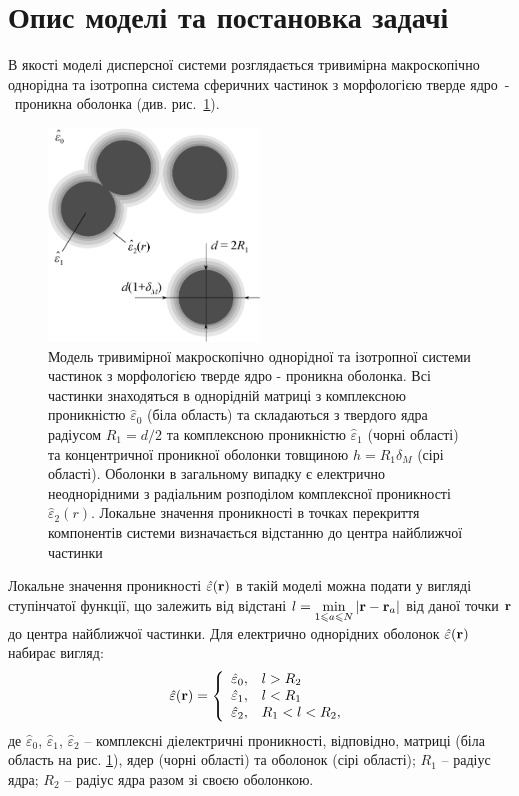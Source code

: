 \documentclass[14pt,twoside]{vakthesis}
\begin{document}
\vspace{40pt}

\section{Опис моделі та постановка задачі}

В якості моделі дисперсної системи розглядається тривимірна макроскопічно однорідна та ізотропна система сферичних частинок з морфологією тверде ядро~-~проникна оболонка (див. рис.~\ref{fig:model-Mlayers}). 
\begin{figure}[!b]
	\vspace{20pt}
	\centering
	\includegraphics[width=0.5\textwidth]{Fig1_Microstructure_new5.eps}
	\caption{\label{fig:model-Mlayers}
		Модель тривимірної макроскопічно однорідної та ізотропної системи частинок з морфологією тверде ядро - проникна оболонка. Всі частинки знаходяться в однорідній матриці з комплексною проникністю $\hat{\varepsilon}_0$ (біла область) та складаються з твердого ядра радіусом $R_1=d/2$ та комплексною проникністю $\hat{\varepsilon}_1$ (чорні області) та концентричної проникної оболонки товщиною $h=R_1\delta_M$ (сірі області). Оболонки в загальному випадку є електрично неоднорідними з радіальним розподілом комплексної проникності $\hat{\varepsilon}_2(r)$. Локальне значення проникності в точках перекриття компонентів системи визначається відстанню до центра найближчої частинки}
\end{figure} 
Локальне значення проникності $\hat{\varepsilon} ({\bf r})$ в такій моделі можна подати у вигляді ступінчатої функції, що залежить від відстані $l = \min\limits_{1 \leq a \leq N} |{\bf r} - {\bf r}_a|$ від даної точки ${\bf r}$ до центра найближчої частинки. Для електрично однорідних оболонок $\hat{\varepsilon} ({\bf r})$ набирає вигляд:
\begin{equation}\label{eq:local-perm-1layer}
\hat{\varepsilon} ({\bf r}) = \left\{ 
\begin{array}{ll}
\hat{\varepsilon}_0, & l > R_2\\
\hat{\varepsilon}_1, & l < R_1\\
\hat{\varepsilon}_2, & R_1 < l < R_2,
\end{array}
\right.
\end{equation}
де $\hat{\varepsilon}_0$, $\hat{\varepsilon}_1$, $\hat{\varepsilon}_2$ -- комплексні діелектричні проникності, відповідно, матриці (біла область на рис. \ref{fig:model-Mlayers}), ядер (чорні області) та оболонок (сірі області); $R_1$ -- радіус ядра; $R_2$ -- радіус ядра разом зі своєю оболонкою. 
\end{document}
